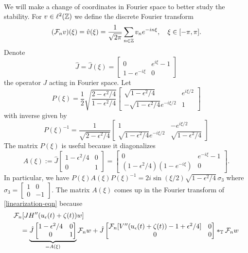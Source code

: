 We will make a change of coordinates in Fourier space to better study the stability. For \(v \in \ell^2(\mathbb{Z})\) we define the discrete Fourier transform
\begin{equation*} 
	(\mathcal{F}_n v)(\xi) = \hat v (\xi) = \frac 1 {\sqrt {2\pi}} \sum_{n\in \mathbb{Z}} v_n e^{-in \xi}, \quad \xi\in[-\pi, \pi].
\end{equation*} 
Denote
\begin{equation*} 
	\hat J = \hat J(\xi) = \begin{bmatrix}
		0 & e^{i\xi} - 1 \\
		1 - e^{-i\xi} & 0
	\end{bmatrix}
\end{equation*} 
the operator \(J\) acting in Fourier space. Let 
\begin{equation*} 
	P(\xi) = \frac 1 2 \sqrt{\frac{2 - \epsilon^2/4}{1 - \epsilon^2/4}} \begin{bmatrix}
		\sqrt{1-\epsilon^2/4} & e^{i\xi/2} \\
		-\sqrt{1-\epsilon^2/4} e^{-i\xi/2} & 1
	\end{bmatrix}
\end{equation*} 
with inverse given by 
\begin{equation*} 
	P(\xi)^{-1} = \frac 1 {\sqrt{2-\epsilon^2/4}} \begin{bmatrix}
		1 & - e^{i\xi/2} \\
		\sqrt{1-\epsilon^2/4}  e^{-i\xi /2} & \sqrt{1-\epsilon^2 /4}
	\end{bmatrix}
\end{equation*} 
The matrix \(P(\xi)\) is useful because it diagonalizes 
\begin{equation*} 
	A(\xi) := \hat J  \begin{bmatrix}
		1 - \epsilon^2/4 & 0 \\
		0 & 1
	\end{bmatrix} = \begin{bmatrix}
		0 & e^{-i\xi} -  1 \\
		(1-\epsilon^2 /4)(1-e^{-i\xi}) & 0
	\end{bmatrix}.
\end{equation*} 
In particular, we have \(P(\xi) A(\xi) P(\xi)^{-1} = 2i \sin(\xi/2) \sqrt{1-\epsilon^2/4}\, \sigma_3\) where \(\sigma_3 = \begin{bmatrix}
	1 & 0 \\ 0 & -1
\end{bmatrix}\).
The matrix \(A(\xi)\) comes up in the Fourier transform of \cref{linearization-eqn} because
\begin{equation*} 
	\begin{aligned}
	&\mathcal{F}_n[ JH''(u_\epsilon(t) + \zeta(t)) w]\\
	&\quad = \underbrace{\hat J \begin{bmatrix}
			1-\epsilon^2/4 & 0 \\
			0 & 1
	\end{bmatrix}}_{=A(\xi)} \mathcal{F}_n w + \hat J\begin{bmatrix}
		\mathcal{F}_n [V''(u_\epsilon(t) + \zeta(t)) - 1 + \epsilon^2 /4 ]& 0 \\
		0 & 0 
	\end{bmatrix} *_{\mathbb T} \mathcal{F}_n w
	\end{aligned}
\end{equation*}  
